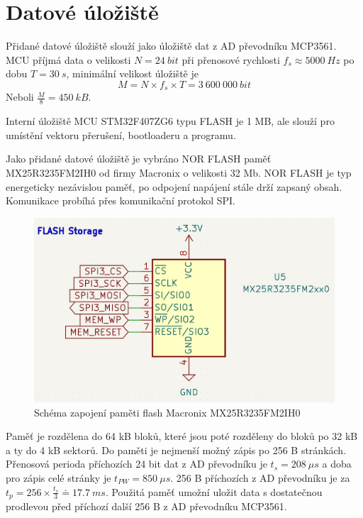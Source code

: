 \section{Datové úložiště}
Přidané datové úložiště slouží jako úložiště dat z AD převodníku MCP3561. MCU příjmá data o velikosti $N = 24 \ bit$ při přenosové rychlosti $f_s \approx 5000 \ Hz$ po dobu $T = 30 \ s$, minimální velikost úložiště je
\begin{equation*}
    M = N \times f_s \times T = 3 \ 600 \ 000 \ bit
\end{equation*}
Neboli $\frac{M}{8} = 450 \ kB$.
\par
Interní úložiště MCU STM32F407ZG6 typu FLASH je 1 MB, ale slouží pro umístění vektoru přerušení, bootloaderu a programu.
\par
Jako přidané datové úložiště je vybráno NOR FLASH paměť MX25R3235FM2IH0 od firmy Macronix o velikosti 32 Mb. NOR FLASH je typ energeticky nezávislou paměť, po odpojení napájení stále drží zapsaný obsah. Komunikace probíhá přes komunikační protokol SPI.
\begin{figure}[H]
    \label{fig:flash_memory}
    \caption{Schéma zapojení paměti flash Macronix MX25R3235FM2IH0}
    \includegraphics[width=1\textwidth]{pictures/flash_memory.jpg}
\end{figure}
Paměť je rozdělena do 64 kB bloků, které jsou poté rozděleny do bloků po 32 kB a ty do 4 kB sektorů. Do paměti je nejmenší možný zápis po 256 B stránkách. Přenosová perioda příchozích 24 bit dat z AD převodníku je $t_s = 208 \ \mu s$ a doba pro zápis celé stránky je $t_{PW} = 850 \ \mu s$. 256 B příchozích z AD převodníku je za $t_p = 256 \times \frac{t_s}{3} \doteq 17.7 \ ms$.
Použitá paměť umožní uložit data s dostatečnou prodlevou před příchozí další 256 B z AD převodníku MCP3561.
